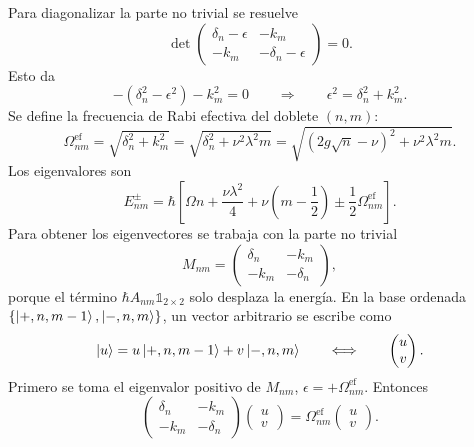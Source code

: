 \documentclass[11pt]{article}
\begin{document}
Para diagonalizar la parte no trivial se resuelve
\begin{equation}
  \det
  \begin{pmatrix}
  \delta_n-\epsilon & -k_m\\
  -k_m & -\delta_n-\epsilon
  \end{pmatrix}
  =
  0.
\end{equation}
Esto da
\begin{equation}
  -(\delta_n^2-\epsilon^2)-k_m^2=0
  \qquad\Rightarrow\qquad
  \epsilon^2=\delta_n^2+k_m^2.
\end{equation}
Se define la frecuencia de Rabi efectiva del doblete $(n,m)$:
\begin{equation}
  \boxed{
  \Omega_{nm}^{\mathrm{ef}}
  =
  \sqrt{\delta_n^2+k_m^2}
  =
  \sqrt{\delta_n^2+\nu^2\lambda^2m}
  =
  \sqrt{(2g\sqrt n-\nu)^2+\nu^2\lambda^2m}.
  }
\end{equation}
Los eigenvalores son
\begin{equation}
  \boxed{
  E_{nm}^{\pm}
  =
  \hbar
  \left[
  \Omega n+\frac{\nu\lambda^2}{4}
  +
  \nu\left(m-\frac{1}{2}\right)
  \pm
  \frac{1}{2}\Omega_{nm}^{\mathrm{ef}}
  \right].
  }
\end{equation}
Para obtener los eigenvectores se trabaja con la parte no trivial
\begin{equation}
  M_{nm}
  =
  \begin{pmatrix}
  \delta_n & -k_m\\
  -k_m & -\delta_n
  \end{pmatrix},
\end{equation}
porque el t\'ermino $\hbar A_{nm}\mathds{1}_{2\times2}$ solo desplaza la
energ\'ia. En la base ordenada $\{\ket{+,n,m-1},\ket{-,n,m}\}$, un vector
arbitrario se escribe como
\begin{equation}
  \ket{u}
  =
  u\ket{+,n,m-1}
  +
  v\ket{-,n,m}
  \qquad\Longleftrightarrow\qquad
  \begin{pmatrix}
  u\\
  v
  \end{pmatrix}.
\end{equation}
Primero se toma el eigenvalor positivo de $M_{nm}$,
$\epsilon=+\Omega_{nm}^{\mathrm{ef}}$. Entonces
\begin{equation}
  \begin{pmatrix}
  \delta_n & -k_m\\
  -k_m & -\delta_n
  \end{pmatrix}
  \begin{pmatrix}
  u\\
  v
  \end{pmatrix}
  =
  \Omega_{nm}^{\mathrm{ef}}
  \begin{pmatrix}
  u\\
  v
  \end{pmatrix}.
\end{equation}
\end{document}

